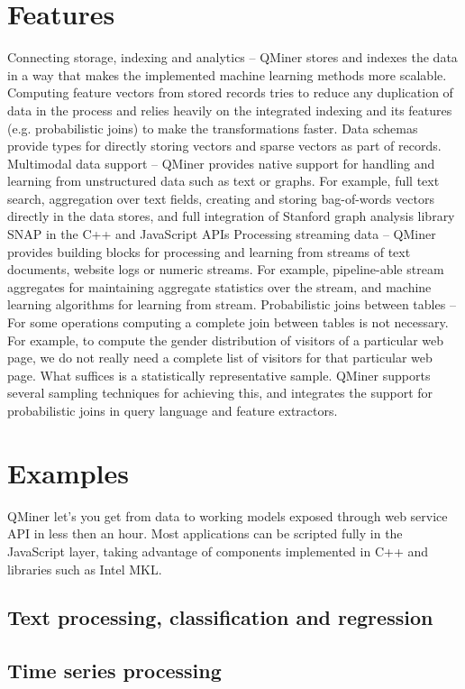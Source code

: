 \documentclass{article} %
\begin{document}
\section{Features}
Connecting storage, indexing and analytics – QMiner stores and indexes the data in a way that makes the implemented machine learning methods more scalable. Computing feature vectors from stored records tries to reduce any duplication of data in the process and relies heavily on the integrated indexing and its features (e.g. probabilistic joins) to make the transformations faster. Data schemas provide types for directly storing vectors and sparse vectors as part of records.
Multimodal data support – QMiner provides native support for handling and learning from unstructured data such as text or graphs. For example, full text search, aggregation over text fields, creating and storing bag-of-words vectors directly in the data stores, and full integration of Stanford graph analysis library SNAP in the C++ and JavaScript APIs
Processing streaming data – QMiner provides building blocks for processing and learning from streams of text documents, website logs or numeric streams. For example, pipeline-able stream aggregates for maintaining aggregate statistics over the stream, and machine learning algorithms for learning from stream.
Probabilistic joins between tables – For some operations computing a complete join between tables is not necessary. For example, to compute the gender distribution of visitors of a particular web page, we do not really need a complete list of visitors for that particular web page. What suffices is a statistically representative sample. QMiner supports several sampling techniques for achieving this, and integrates the support for probabilistic joins in query language and feature extractors.


\section{Examples}
QMiner let’s you get from data to working models exposed through web service API in less then an hour. Most applications can be scripted fully in the JavaScript layer, taking advantage of components implemented in C++ and libraries such as Intel MKL.


\subsection{Text processing, classification and regression}

\subsection{Time series processing}
\end{document}
